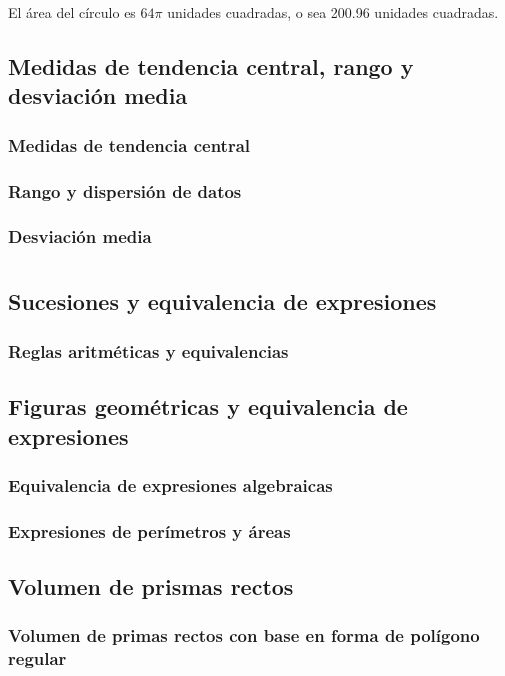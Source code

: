 \documentclass[11pt]{book}
\begin{document}
El área del círculo es $64\pi$ unidades cuadradas, o sea 200.96 unidades cuadradas.

\section{Medidas de tendencia central, rango y desviación media}
\subsection{Medidas de tendencia central}
\subsection{Rango y dispersi\'on de datos}
\subsection{Desviaci\'on media}


\chapter{}

\section{Sucesiones y equivalencia de expresiones}
\subsection{Reglas aritméticas y equivalencias}

\section{Figuras geométricas y equivalencia de expresiones}
\subsection{Equivalencia de expresiones algebraicas}
\subsection{Expresiones de perímetros y áreas}

\section{Volumen de prismas rectos}
\subsection{Volumen de primas rectos con base en forma de polígono regular}
\end{document}
